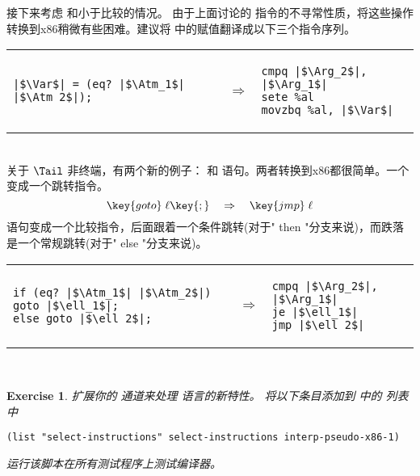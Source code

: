 \documentclass[11pt]{book}
\newtheorem{exercise}[theorem]{Exercise}
\begin{document}
接下来考虑  和小于比较的情况。
由于上面讨论的  指令的不寻常性质，将这些操作转换到x86稍微有些困难。建议将  中的赋值翻译成以下三个指令序列。 \\
\begin{tabular}{lll}
\begin{minipage}{0.4\textwidth}
\begin{lstlisting}
|$\Var$| = (eq? |$\Atm_1$| |$\Atm_2$|);
\end{lstlisting}
\end{minipage}
&
$\Rightarrow$
&
\begin{minipage}{0.4\textwidth}
\begin{lstlisting}
cmpq |$\Arg_2$|, |$\Arg_1$|
sete %al
movzbq %al, |$\Var$|
\end{lstlisting}
\end{minipage}
\end{tabular}  \\

关于 $\Tail$ 非终端，有两个新的例子： 
和  语句。两者转换到x86都很简单。一个  变成一个跳转指令。
\[
\key{goto}\; \ell\key{;} \quad \Rightarrow \quad \key{jmp}\;\ell
\]
  语句变成一个比较指令，后面跟着一个条件跳转(对于" then "分支来说)，而跌落是一个常规跳转(对于" else "分支来说)。\\
\begin{tabular}{lll}
\begin{minipage}{0.4\textwidth}
\begin{lstlisting}
if (eq? |$\Atm_1$| |$\Atm_2$|) goto |$\ell_1$|;
else goto |$\ell_2$|;
\end{lstlisting}
\end{minipage}
&
$\Rightarrow$
&
\begin{minipage}{0.4\textwidth}
\begin{lstlisting}
cmpq |$\Arg_2$|, |$\Arg_1$|
je |$\ell_1$|
jmp |$\ell_2$|
\end{lstlisting}
\end{minipage}
\end{tabular}  \\

\begin{exercise}\normalfont
扩展你的  通道来处理 \LangIf{} 语言的新特性。
%
将以下条目添加到 中的  列表中
\begin{lstlisting}
(list "select-instructions" select-instructions interp-pseudo-x86-1)
\end{lstlisting}
%
运行该脚本在所有测试程序上测试编译器。
\end{exercise}
\end{document}
